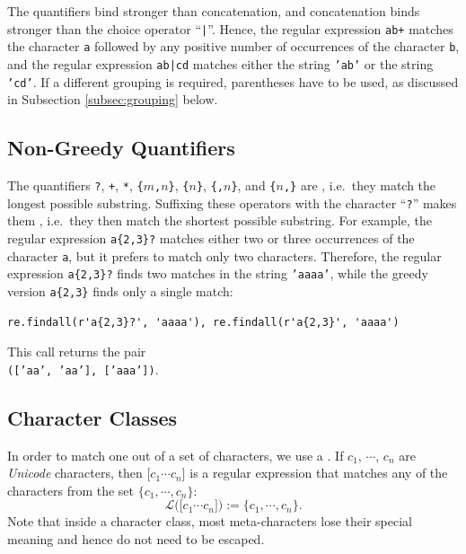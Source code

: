 \remarkEng
The quantifiers bind stronger than concatenation, and concatenation binds stronger than the choice operator
``\texttt{|}''.  Hence, the regular expression \texttt{ab+} matches the character \texttt{a} followed by any
positive number of occurrences of the character \texttt{b}, and the regular expression
\texttt{ab|cd} matches either the string \texttt{'ab'} or the string \texttt{'cd'}.  If a different grouping is
required, parentheses have to be used, as discussed in Subsection \ref{subsec:grouping} below.
\eox

\subsection{Non-Greedy Quantifiers}
The quantifiers \texttt{?}, \texttt{+}, \texttt{*}, \texttt{\{}$m$\texttt{,}$n$\texttt{\}},
\texttt{\{}$n$\texttt{\}}, \texttt{\{,}$n$\texttt{\}}, and \texttt{\{}$n$\texttt{,\}} are
, i.e.\ they match the longest possible substring.  Suffixing these operators with
the character ``\texttt{?}'' makes them , i.e.\ they then match the shortest
possible substring.  For example, the regular expression \texttt{a\{2,3\}?} matches either two or three
occurrences of the character \texttt{a}, but it prefers to match only two characters.  Therefore, the regular
expression \texttt{a\{2,3\}?} finds two matches in the string \texttt{'aaaa'}, while the greedy version
\texttt{a\{2,3\}} finds only a single match:

\begin{verbatim}
re.findall(r'a{2,3}?', 'aaaa'), re.findall(r'a{2,3}', 'aaaa')
\end{verbatim}

\noindent
This call returns the pair
\\[0.2cm]
\hspace*{1.3cm}
\texttt{(['aa', 'aa'], ['aaa'])}.

\subsection{Character Classes}
In order to match one out of a set of characters, we use a .  If $c_1$, $\cdots$, $c_n$
are \emph{Unicode} characters, then $\texttt{[}c_1\cdots c_n\texttt{]}$ is a regular expression that matches
any of the characters from the set $\{c_1,\cdots,c_n\}$:
$$\mathcal{L}\bigl(\texttt{[}c_1\cdots c_n\texttt{]}\bigr) := \{ c_1, \cdots, c_n \}.$$
Note that inside a character class, most meta-characters lose their special meaning and hence do not need to be
escaped.


